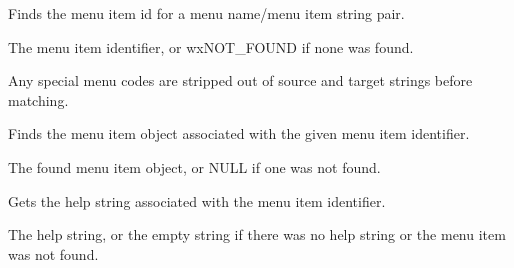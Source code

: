 
Finds the menu item id for a menu name/menu item string pair.





The menu item identifier, or wxNOT\_FOUND if none was found.


Any special menu codes are stripped out of source and target strings
before matching.

\label{wxmenubarfinditem}


Finds the menu item object associated with the given menu item identifier.





The found menu item object, or NULL if one was not found.

\label{wxmenubargethelpstring}


Gets the help string associated with the menu item identifier.




The help string, or the empty string if there was no help string or the menu item
was not found.



\label{wxmenubargetlabel}


